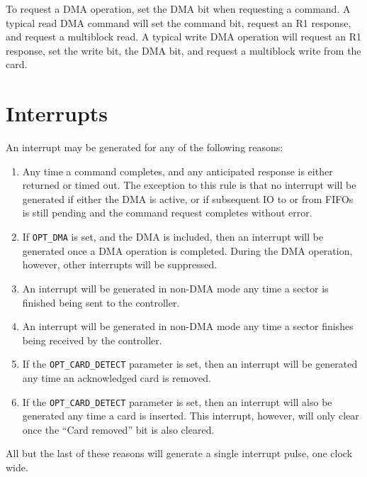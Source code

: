\documentclass{gqtekspec}
\begin{document}
To request a DMA operation, set the DMA bit when requesting a command.  A
typical read DMA command will set the command bit, request an R1 response, and
request a multiblock read.  A typical write DMA operation will request an
R1 response, set the write bit, the DMA bit, and request a multiblock write
from the card.

\chapter{Interrupts}\label{ch:int}
An interrupt may be generated for any of the following reasons:

\begin{enumerate}
\item Any time a command completes, and any anticipated response is either
	returned or timed out.  The exception to this rule is that no interrupt
	will be generated if either the DMA is active, or if subsequent IO to
	or from FIFOs is still pending and the command request completes
	without error.
\item If {\tt OPT\_DMA} is set, and the DMA is included, then an interrupt will
	be generated once a DMA operation is completed.  During the DMA
	operation, however, other interrupts will be suppressed.
\item An interrupt will be generated in non-DMA mode any time a sector is
	finished being sent to the controller.
\item An interrupt will be generated in non-DMA mode any time a sector
	finishes being received by the controller.
\item If the {\tt OPT\_CARD\_DETECT} parameter is set, then an interrupt
	will be generated any time an acknowledged card is removed.
\item If the {\tt OPT\_CARD\_DETECT} parameter is set, then an interrupt will
	also be generated any time a card is inserted.  This
	interrupt, however, will only clear once the ``Card removed'' bit is
	also cleared.
\end{enumerate}

All but the last of these reasons will generate a single interrupt pulse,
one clock wide.
\end{document}
